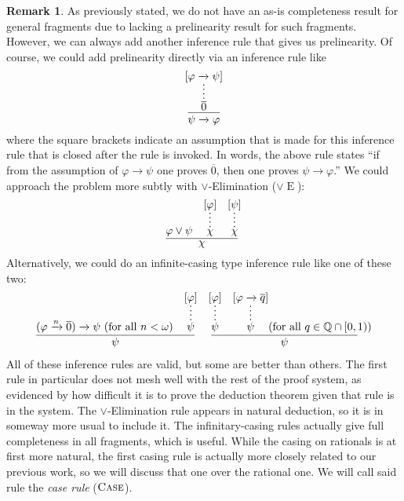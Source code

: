 \documentclass{amsart}
\theoremstyle{definition}
\newtheorem{remark}[theorem]{Remark}
\numberwithin{equation}{theorem}
\renewcommand{\phi}{\varphi}
\newcommand{\Q}{\mathbb{Q}}
\newcommand{\unvee}{{\vee}}
\newcommand{\rat}[1]{{\overline{#1}}}
\newcommand{\narrow}[1]{\xrightarrow{#1}}
\renewcommand{\to}{\narrow{}}
\newcommand{\elim}{\!\operatorname{E}}
\begin{document}
\begin{remark}
  As previously stated, we do not have an as-is completeness result for general fragments due to lacking a prelinearity result for such fragments.
  However, we can always add another inference rule that gives us prelinearity.
  Of course, we could add prelinearity directly via an inference rule like
  \[
    \infer{\psi\to\phi}{
      \infer*{\rat 0}{[\phi\to\psi]}
    }
  \]
  where the square brackets indicate an assumption that is made for this inference rule that is closed after the rule is invoked.
  In words, the above rule states ``if from the assumption of $\phi\to\psi$ one proves $\rat 0$, then one proves $\psi\to\phi$.''
  We could approach the problem more subtly with $\unvee$-Elimination ($\unvee\elim$):
  \[
    \infer{\chi}{
      \phi\vee\psi &
      \infer*{\chi}{[\phi]} &
      \infer*{\chi}{[\psi]}
    }
  \]
  Alternatively, we could do an infinite-casing type inference rule like one of these two:
  \begin{align*}
    \infer{\psi}{
      (\phi\narrow n\rat 0)\to\psi\text{ (for all $n<\omega$)} &
      \infer*{\psi}{[\phi]}
    } &&
    \infer{\psi}{
      \infer*{\psi}{[\phi]} &
      \infer*{\psi}{[\phi\to\rat q]}
      \text{(for all $q\in\Q\cap[0,1)$)}
    }
  \end{align*}
  All of these inference rules are valid, but some are better than others.
  The first rule in particular does not mesh well with the rest of the proof system, as evidenced by how difficult it is to prove the deduction theorem given that rule is in the system.
  The $\unvee$-Elimination rule appears in natural deduction, so it is in someway more usual to include it.
  The infinitary-casing rules actually give full completeness in all fragments, which is useful.
  While the casing on rationals is at first more natural, the first casing rule is actually more  closely related to our previous work, so we will discuss that one over the rational one.
  We will call said rule the \emph{case rule} ($\text{\sc{Case}}$).
\end{remark}
\end{document}
